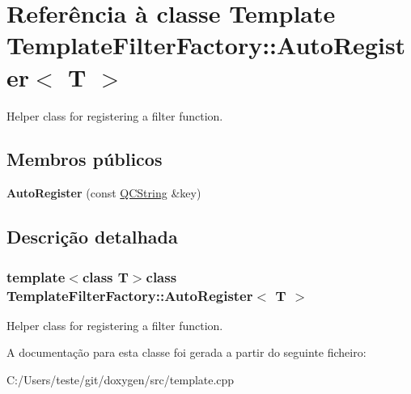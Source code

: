 \hypertarget{class_template_filter_factory_1_1_auto_register}{\section{Referência à classe Template Template\-Filter\-Factory\-:\-:Auto\-Register$<$ T $>$}
\label{class_template_filter_factory_1_1_auto_register}
}


Helper class for registering a filter function.  


\subsection*{Membros públicos}
\begin{DoxyCompactItemize}
\item 
\hypertarget{class_template_filter_factory_1_1_auto_register_acebfd9126d99a204c06188d4a3b405fe}{{\bfseries Auto\-Register} (const \hyperlink{class_q_c_string}{Q\-C\-String} \&key)}\label{class_template_filter_factory_1_1_auto_register_acebfd9126d99a204c06188d4a3b405fe}

\end{DoxyCompactItemize}


\subsection{Descrição detalhada}
\subsubsection*{template$<$class T$>$class Template\-Filter\-Factory\-::\-Auto\-Register$<$ T $>$}

Helper class for registering a filter function. 

A documentação para esta classe foi gerada a partir do seguinte ficheiro\-:\begin{DoxyCompactItemize}
\item 
C\-:/\-Users/teste/git/doxygen/src/template.\-cpp\end{DoxyCompactItemize}
